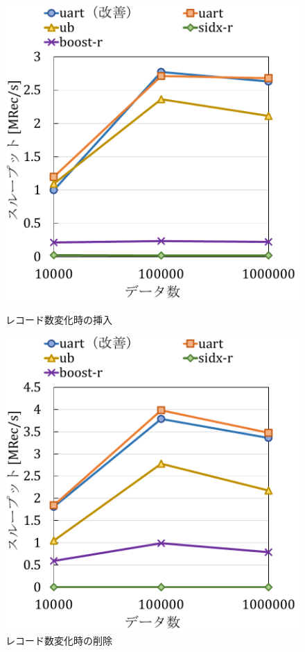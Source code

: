 \begin{figure}[tb]
  \begin{minipage}[c]{0.495\textwidth}
    \centering
    \includegraphics[scale=0.5]{./figures/graph-datasize-insert.pdf}
    \caption{レコード数変化時の挿入}
    \label{graph:rec-ins}
  \end{minipage}
  \begin{minipage}[c]{0.495\textwidth}
    \centering
    \includegraphics[scale=0.5]{./figures/graph-datasize-delete.pdf}
    \caption{レコード数変化時の削除}
    \label{graph:rec-del}
  \end{minipage}
\end{figure}
